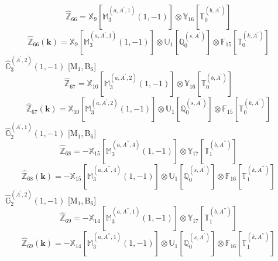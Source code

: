 \documentclass[fleqn,10pt,landscape]{article}
\begin{document}
\begin{itemize}
\begin{dmath*}
\hat{\mathbb{Z}}_{66}=\mathbb{X}_{9}[\mathbb{M}_{3}^{(a,A^{\prime},1)}(1,-1)] \otimes\mathbb{Y}_{16}[\mathbb{T}_{0}^{(b,A^{\prime})}]
\end{dmath*}
\begin{dmath*}
\hat{\mathbb{Z}}_{66}(\bm{k})=\mathbb{X}_{9}[\mathbb{M}_{3}^{(a,A^{\prime},1)}(1,-1)] \otimes\mathbb{U}_{1}[\mathbb{Q}_{0}^{(s,A^{\prime})}] \otimes\mathbb{F}_{15}[\mathbb{T}_{0}^{(k,A^{\prime})}]
\end{dmath*}
\vspace{4mm}
\noindent {} $\,\,\,\hat{\mathbb{G}}_{3}^{(A^{\prime},2)}(1,-1)$ [M$_{1}$,\,B$_{6}$]
\begin{dmath*}
\hat{\mathbb{Z}}_{67}=\mathbb{X}_{10}[\mathbb{M}_{3}^{(a,A^{\prime},2)}(1,-1)] \otimes\mathbb{Y}_{16}[\mathbb{T}_{0}^{(b,A^{\prime})}]
\end{dmath*}
\begin{dmath*}
\hat{\mathbb{Z}}_{67}(\bm{k})=\mathbb{X}_{10}[\mathbb{M}_{3}^{(a,A^{\prime},2)}(1,-1)] \otimes\mathbb{U}_{1}[\mathbb{Q}_{0}^{(s,A^{\prime})}] \otimes\mathbb{F}_{15}[\mathbb{T}_{0}^{(k,A^{\prime})}]
\end{dmath*}
\vspace{4mm}
\noindent {} $\,\,\,\hat{\mathbb{G}}_{2}^{(A^{\prime},1)}(1,-1)$ [M$_{1}$,\,B$_{6}$]
\begin{dmath*}
\hat{\mathbb{Z}}_{68}=- \mathbb{X}_{15}[\mathbb{M}_{3}^{(a,A^{\prime\prime},4)}(1,-1)] \otimes\mathbb{Y}_{17}[\mathbb{T}_{1}^{(b,A^{\prime\prime})}]
\end{dmath*}
\begin{dmath*}
\hat{\mathbb{Z}}_{68}(\bm{k})=- \mathbb{X}_{15}[\mathbb{M}_{3}^{(a,A^{\prime\prime},4)}(1,-1)] \otimes\mathbb{U}_{1}[\mathbb{Q}_{0}^{(s,A^{\prime})}] \otimes\mathbb{F}_{16}[\mathbb{T}_{1}^{(k,A^{\prime\prime})}]
\end{dmath*}
\vspace{4mm}
\noindent {} $\,\,\,\hat{\mathbb{G}}_{2}^{(A^{\prime},2)}(1,-1)$ [M$_{1}$,\,B$_{6}$]
\begin{dmath*}
\hat{\mathbb{Z}}_{69}=- \mathbb{X}_{14}[\mathbb{M}_{3}^{(a,A^{\prime\prime},1)}(1,-1)] \otimes\mathbb{Y}_{17}[\mathbb{T}_{1}^{(b,A^{\prime\prime})}]
\end{dmath*}
\begin{dmath*}
\hat{\mathbb{Z}}_{69}(\bm{k})=- \mathbb{X}_{14}[\mathbb{M}_{3}^{(a,A^{\prime\prime},1)}(1,-1)] \otimes\mathbb{U}_{1}[\mathbb{Q}_{0}^{(s,A^{\prime})}] \otimes\mathbb{F}_{16}[\mathbb{T}_{1}^{(k,A^{\prime\prime})}]
\end{dmath*}

\end{itemize}
\end{document}
